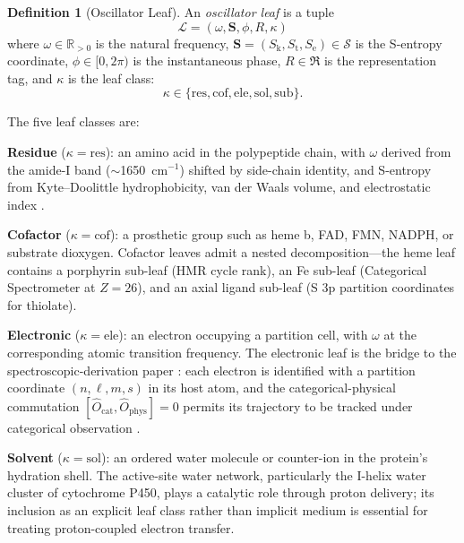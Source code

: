 \documentclass[11pt,twocolumn,a4paper]{article}
\theoremstyle{definition}
\newtheorem{definition}[theorem]{Definition}
\theoremstyle{remark}
\newcommand{\Sk}{S_{\mathrm{k}}}
\newcommand{\St}{S_{\mathrm{t}}}
\newcommand{\Se}{S_{\mathrm{e}}}
\newcommand{\Sspace}{\mathcal{S}}
\newcommand{\Scoord}{\mathbf{S}}
\newcommand{\R}{\mathbb{R}}
\newcommand{\Reps}{\mathfrak{R}}
\newcommand{\Leaf}{\mathcal{L}}
\begin{document}
\begin{definition}[Oscillator Leaf]
\label{def:leaf}
An \emph{oscillator leaf} is a tuple
\begin{equation}
\Leaf = (\omega, \Scoord, \phi, R, \kappa)
\end{equation}
where $\omega \in \R_{>0}$ is the natural frequency, $\Scoord = (\Sk, \St, \Se) \in \Sspace$ is the S-entropy coordinate, $\phi \in [0, 2\pi)$ is the instantaneous phase, $R \in \Reps$ is the representation tag, and $\kappa$ is the leaf class:
\begin{equation}
\kappa \in \{\mathrm{res}, \mathrm{cof}, \mathrm{ele}, \mathrm{sol}, \mathrm{sub}\}.
\end{equation}
\end{definition}

The five leaf classes are:

\textbf{Residue} ($\kappa = \mathrm{res}$): an amino acid in the polypeptide chain, with $\omega$ derived from the amide-I band ($\sim$1650~cm$^{-1}$) shifted by side-chain identity, and S-entropy from Kyte--Doolittle hydrophobicity, van der Waals volume, and electrostatic index \citep{kyte1982, sachikonye2025c}.

\textbf{Cofactor} ($\kappa = \mathrm{cof}$): a prosthetic group such as heme b, FAD, FMN, NADPH, or substrate dioxygen. Cofactor leaves admit a nested decomposition---the heme leaf contains a porphyrin sub-leaf (HMR cycle rank), an Fe sub-leaf (Categorical Spectrometer at $Z = 26$), and an axial ligand sub-leaf (S 3p partition coordinates for thiolate).

\textbf{Electronic} ($\kappa = \mathrm{ele}$): an electron occupying a partition cell, with $\omega$ at the corresponding atomic transition frequency. The electronic leaf is the bridge to the spectroscopic-derivation paper \citep{sachikonye2025spec}: each electron is identified with a partition coordinate $(n, \ell, m, s)$ in its host atom, and the categorical-physical commutation $[\hat{O}_{\mathrm{cat}}, \hat{O}_{\mathrm{phys}}] = 0$ permits its trajectory to be tracked under categorical observation \citep{sachikonye2025_azurin, sachikonye2025_sod1}.

\textbf{Solvent} ($\kappa = \mathrm{sol}$): an ordered water molecule or counter-ion in the protein's hydration shell. The active-site water network, particularly the I-helix water cluster of cytochrome P450, plays a catalytic role through proton delivery; its inclusion as an explicit leaf class rather than implicit medium is essential for treating proton-coupled electron transfer.
\end{document}

